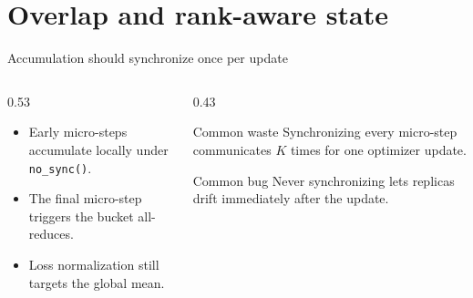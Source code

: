 \documentclass[handout]{beamer}
\begin{document}
\section{Overlap and rank-aware state}

\begin{frame}{Accumulation should synchronize once per update}
  \begin{columns}[c]
    \begin{column}{0.53\linewidth}
      \begin{itemize}
          \setlength{\itemsep}{8pt}
        \item Early micro-steps accumulate locally under \texttt{no\_sync()}.
        \item The final micro-step triggers the bucket all-reduces.
        \item Loss normalization still targets the global mean.
      \end{itemize}
    \end{column}
    \begin{column}{0.43\linewidth}
      \begin{alertblock}{Common waste}
        Synchronizing every micro-step communicates $K$ times for one optimizer update.
      \end{alertblock}
      \begin{block}{Common bug}
        Never synchronizing lets replicas drift immediately after the update.
      \end{block}
    \end{column}
  \end{columns}
\end{frame}
\end{document}
